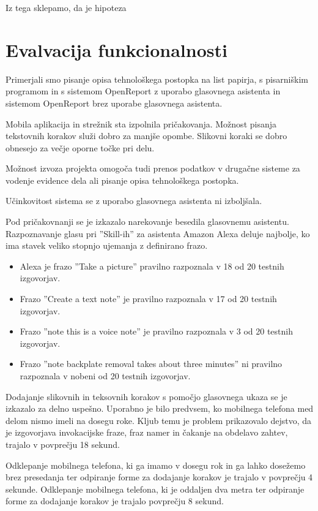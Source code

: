 \documentclass[a4paper, 12pt]{book}
\begin{document}
\bigbreak
\bigbreak
\noindent Iz tega sklepamo, da je hipoteza


\section{Evalvacija funkcionalnosti}

Primerjali smo pisanje opisa tehnološkega postopka na list papirja, s pisarniškim programom in s sistemom OpenReport z uporabo glasovnega asistenta in sistemom OpenReport brez uporabe glasovnega asistenta.

Mobila aplikacija in strežnik sta izpolnila pričakovanja.
Možnost pisanja tekstovnih korakov služi dobro za manjše opombe.
Slikovni koraki se dobro obnesejo za večje oporne točke pri delu.

Možnost izvoza projekta omogoča tudi prenos podatkov v drugačne sisteme za vodenje evidence dela ali pisanje opisa tehnološkega postopka.

Učinkovitost sistema se z uporabo glasovnega asistenta ni izboljšala.

Pod pričakovnanji se je izkazalo narekovanje besedila glasovnemu asistentu.
Razpoznavanje glasu pri ''Skill-ih'' za asistenta Amazon Alexa deluje najbolje, ko ima stavek veliko stopnjo ujemanja z definirano frazo.
\begin{itemize}
	\item Alexa je frazo ''Take a picture'' pravilno razpoznala v 18 od 20 testnih izgovorjav.
	\item Frazo ''Create a text note'' je pravilno razpoznala v 17 od 20 testnih izgovorjav.
	\item Frazo ''note this is a voice note'' je pravilno razpoznala v 3 od 20 testnih izgovorjav.
	\item Frazo ''note backplate removal takes about three minutes'' ni pravilno razpoznala v nobeni od 20 testnih izgovorjav.
\end{itemize}

Dodajanje slikovnih in teksovnih korakov s pomočjo glasovnega ukaza se je izkazalo za delno uspešno.
Uporabno je bilo predvsem, ko mobilnega telefona med delom nismo imeli na dosegu roke.
Kljub temu je problem prikazovalo dejstvo, da je izgovorjava invokacijske fraze, fraz namer in čakanje na obdelavo zahtev, trajalo v povprečju 18 sekund.


Odklepanje mobilnega telefona, ki ga imamo v dosegu rok in ga lahko dosežemo brez presedanja ter odpiranje forme za dodajanje korakov je trajalo v povprečju 4 sekunde.
Odklepanje mobilnega telefona, ki je oddaljen dva metra ter odpiranje forme za dodajanje korakov je trajalo povprečju 8 sekund.
\end{document}
